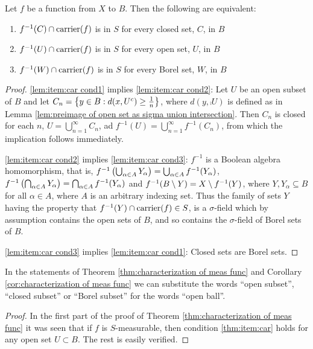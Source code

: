 \begin{lemma}
Let $f$ be a function from $X$ to $B$. Then the following are equivalent:
\begin{enumerate}[label=\arabic*),ref=\arabic*)]
    \item \label{lem:item:car cond1}
    $f^{-1}(C)\cap\operatorname{carrier}(f)$ is in $S$ for every closed set, $C$, in $B$
    \item \label{lem:item:car cond2}
    $f^{-1}(U)\cap\operatorname{carrier}(f)$ is in $S$ for every open set, $U$, in $B$
    \item \label{lem:item:car cond3}
    $f^{-1}(W)\cap\operatorname{carrier}(f)$ is in $S$ for every Borel set, $W$, in $B$
\end{enumerate}
\end{lemma}
\begin{proof}
\ref{lem:item:car cond1} implies \ref{lem:item:car cond2}: Let $U$ be an open subset of $B$ and let $C_n=\left\{y\in B:d(x,{U}^c)\geq\frac1n\right\}$, where $d(y,\comp{U})$ is defined as in Lemma \ref{lem:preimage of open set as sigma union intersection}. Then $C_n$ is closed for each $n$, $U=\bigcup_{n=1}^\infty C_n$, ad $f^{-1}(U)=\bigcup_{n=1}^\infty f^{-1}(C_n)$, from which the implication follows immediately.

\ref{lem:item:car cond2} implies \ref{lem:item:car cond3}: $f^{-1}$ is a Boolean algebra homomorphism, that is, $f^{-1}\left(\bigcup_{\alpha\in A}Y_\alpha\right)=\bigcup_{\alpha\in A}f^{-1}(Y_\alpha)$, $f^{-1}\left(\bigcap_{\alpha\in A}Y_\alpha\right)=\bigcap_{\alpha\in A}f^{-1}(Y_\alpha)$ and $f^{-1}(B\setminus Y)=X\setminus f^{-1}(Y)$, where $Y,Y_\alpha\subseteq B$ for all $\alpha\in A$, where $A$ is an arbitrary indexing set. Thus the family of sets $Y$ having the property that $f^{-1}(Y)\cap\operatorname{carrier}(f)\in S$, is a $\sigma$-field which by assumption contains the open sets of $B$, and so contains the $\sigma$-field of Borel sets of $B$.

\ref{lem:item:car cond3} implies \ref{lem:item:car cond1}: Closed sets are Borel sets.
\end{proof}

\begin{corollary}
In the statements of Theorem \ref{thm:characterization of meas func} and Corollary \ref{cor:characterization of meas func} we can substitute the words ``open subset'', ``closed subset'' or ``Borel subset'' for the words ``open ball''.
\end{corollary}

\begin{proof}
In the first part of the proof of Theorem \ref{thm:characterization of meas func} it was seen that if $f$ is $S$-measurable, then condition \ref{thm:item:car} holds for any open set $U \subset B$. The rest is easily verified.
\end{proof}

